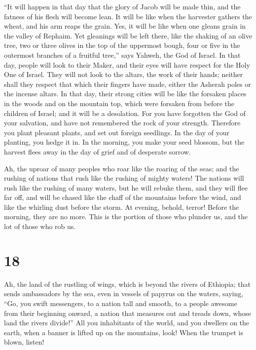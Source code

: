  ``It will happen in that day that the glory of Jacob will
be made thin, and the fatness of his flesh will become lean.
 It will be like when the harvester gathers the wheat, and
his arm reaps the grain. Yes, it will be like when one gleans grain in
the valley of Rephaim.  Yet gleanings will be left there,
like the shaking of an olive tree, two or three olives in the top of the
uppermost bough, four or five in the outermost branches of a fruitful
tree,'' says Yahweh, the God of Israel.  In that day,
people will look to their Maker, and their eyes will have respect for
the Holy One of Israel.  They will not look to the altars,
the work of their hands; neither shall they respect that which their
fingers have made, either the Asherah poles or the incense altars.
 In that day, their strong cities will be like the
forsaken places in the woods and on the mountain top, which were
forsaken from before the children of Israel; and it will be a
desolation.  For you have forgotten the God of your
salvation, and have not remembered the rock of your strength. Therefore
you plant pleasant plants, and set out foreign seedlings.
 In the day of your planting, you hedge it in. In the
morning, you make your seed blossom, but the harvest flees away in the
day of grief and of desperate sorrow.

 Ah, the uproar of many peoples who roar like the roaring
of the seas; and the rushing of nations that rush like the rushing of
mighty waters!  The nations will rush like the rushing of
many waters, but he will rebuke them, and they will flee far off, and
will be chased like the chaff of the mountains before the wind, and like
the whirling dust before the storm.  At evening, behold,
terror! Before the morning, they are no more. This is the portion of
those who plunder us, and the lot of those who rob us.

\hypertarget{section-17}{%
\section{18}\label{section-17}}

 Ah, the land of the rustling of wings, which is beyond
the rivers of Ethiopia;  that sends ambassadors by the
sea, even in vessels of papyrus on the waters, saying, ``Go, you swift
messengers, to a nation tall and smooth, to a people awesome from their
beginning onward, a nation that measures out and treads down, whose land
the rivers divide!''  All you inhabitants of the world,
and you dwellers on the earth, when a banner is lifted up on the
mountains, look! When the trumpet is blown, listen!

